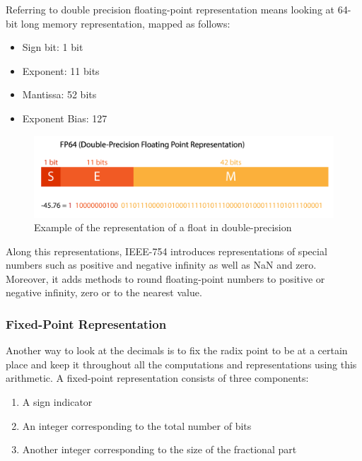 Referring to double precision floating-point representation means looking at 64-bit long memory representation, mapped as follows:
\begin{itemize}
  \item Sign bit: 1 bit
  \item Exponent: 11 bits
  \item Mantissa: 52 bits
  \item Exponent Bias: 127
\end{itemize}

\begin{figure}[htbp]
	\centering
		\includegraphics[width=12cm]{Figures/FP64.png}
	\caption[Double-precision float representation]{Example of the representation of a float in double-precision}
	\label{fig:FP64}
\end{figure}

Along this representations, IEEE-754 introduces representations of special numbers such as positive and negative infinity as well as NaN and zero. Moreover, it adds methods to round floating-point numbers to positive or negative infinity, zero or to the nearest value.

\subsubsection{Fixed-Point Representation}

Another way to look at the decimals is to fix the radix point to be at a certain place and keep it throughout all the computations and representations using this arithmetic. A fixed-point representation consists of three components:
\begin{enumerate}
  \item A sign indicator
  \item An integer corresponding to the total number of bits
  \item Another integer corresponding to the size of the fractional part
\end{enumerate}


